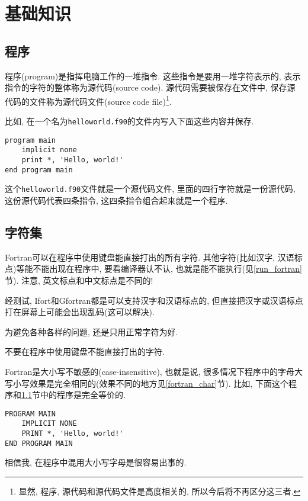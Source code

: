 \chapter{基础知识}

\section{程序}\label{fortran_program}

程序(program)是指挥电脑工作的一堆指令. 这些指令是要用一堆字符表示的, 表示指令的字符的整体称为源代码(source code). 源代码需要被保存在文件中, 保存源代码的文件称为源代码文件(source code file)\footnote{
    显然, 程序, 源代码和源代码文件是高度相关的, 所以今后将不再区分这三者.
}.

比如, 在一个名为\verb|helloworld.f90|的文件内写入下面这些内容并保存.
\begin{verbatim}
program main
    implicit none
    print *, 'Hello, world!'
end program main
\end{verbatim}
这个\verb|helloworld.f90|文件就是一个源代码文件, 里面的四行字符就是一份源代码, 这份源代码代表四条指令, 这四条指令组合起来就是一个程序.

\section{字符集}

Fortran可以在程序中使用键盘能直接打出的所有字符. 其他字符(比如汉字, 汉语标点)等能不能出现在程序中, 要看编译器认不认, 也就是能不能执行(见\ref{run_fortran}节). 注意, 英文标点和中文标点是不同的!

经测试, Ifort和Gfortran都是可以支持汉字和汉语标点的, 但直接把汉字或汉语标点打在屏幕上可能会出现乱码(这可以解决).

为避免各种各样的问题, 还是只用正常字符为好.

\begin{principle}
    不要在程序中使用键盘不能直接打出的字符.
\end{principle}

Fortran是大小写不敏感的(case-insensitive), 也就是说, 很多情况下程序中的字母大写小写效果是完全相同的(效果不同的地方见\ref{fortran_char}节). 比如, 下面这个程序和\ref{fortran_program}节中的程序是完全等价的.
\begin{verbatim}
PROGRAM MAIN
    IMPLICIT NONE
    PRINT *, 'Hello, world!'
END PROGRAM MAIN
\end{verbatim}

相信我, 在程序中混用大小写字母是很容易出事的.

